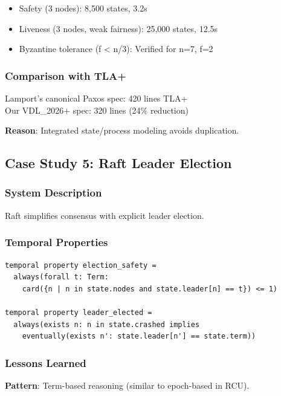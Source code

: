 \documentclass[conference]{IEEEtran}
\begin{document}
\begin{itemize}
\item Safety (3 nodes): 8,500 states, 3.2s
\item Liveness (3 nodes, weak fairness): 25,000 states, 12.5s
\item Byzantine tolerance (f < n/3): Verified for n=7, f=2
\end{itemize}

\subsubsection{Comparison with TLA+}

Lamport's canonical Paxos spec: 420 lines TLA+\\
Our VDL\_2026+ spec: 320 lines (24\% reduction)

\textbf{Reason}: Integrated state/process modeling avoids duplication.

\subsection{Case Study 5: Raft Leader Election}

\subsubsection{System Description}

Raft \cite{ongaro2014} simplifies consensus with explicit leader election.

\subsubsection{Temporal Properties}

\begin{lstlisting}
temporal property election_safety =
  always(forall t: Term:
    card({n | n in state.nodes and state.leader[n] == t}) <= 1)

temporal property leader_elected =
  always(exists n: n in state.crashed implies
    eventually(exists n': state.leader[n'] == state.term))
\end{lstlisting}

\subsubsection{Lessons Learned}

\textbf{Pattern}: Term-based reasoning (similar to epoch-based in RCU).
\end{document}
